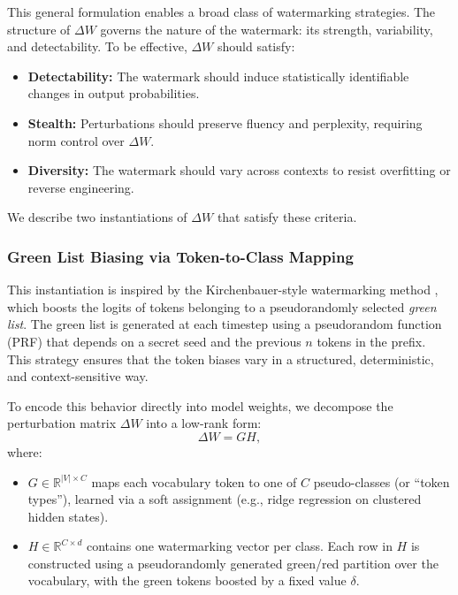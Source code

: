 This general formulation enables a broad class of watermarking strategies. The structure of \( \Delta W \) governs the nature of the watermark: its strength, variability, and detectability. To be effective, \( \Delta W \) should satisfy:
\begin{itemize}
    \item \textbf{Detectability:} The watermark should induce statistically identifiable changes in output probabilities.
    \item \textbf{Stealth:} Perturbations should preserve fluency and perplexity, requiring norm control over \( \Delta W \).
    \item \textbf{Diversity:} The watermark should vary across contexts to resist overfitting or reverse engineering.
\end{itemize}

We describe two instantiations of \( \Delta W \) that satisfy these criteria.

\subsubsection*{Green List Biasing via Token-to-Class Mapping}

This instantiation is inspired by the Kirchenbauer-style watermarking method \citep{kirchenbauer2023watermark}, which boosts the logits of tokens belonging to a pseudorandomly selected \emph{green list}. The green list is generated at each timestep using a pseudorandom function (PRF) that depends on a secret seed and the previous \( n \) tokens in the prefix. This strategy ensures that the token biases vary in a structured, deterministic, and context-sensitive way.

To encode this behavior directly into model weights, we decompose the perturbation matrix \( \Delta W \) into a low-rank form:
\begin{equation}
    \Delta W = G H,
\end{equation}
where:
\begin{itemize}
    \item \( G \in \mathbb{R}^{|V| \times C} \) maps each vocabulary token to one of \( C \) pseudo-classes (or “token types”), learned via a soft assignment (e.g., ridge regression on clustered hidden states).
    \item \( H \in \mathbb{R}^{C \times d} \) contains one watermarking vector per class. Each row in \( H \) is constructed using a pseudorandomly generated green/red partition over the vocabulary, with the green tokens boosted by a fixed value \( \delta \).
\end{itemize}

